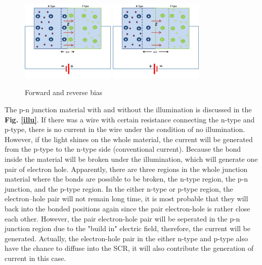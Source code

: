 \documentclass[a4paper, 12pt, titlepage,oneside,drop]{kthesis}
\begin{document}
\begin{figure}[H]
    \begin{center}
            \includegraphics[width=0.4\textwidth,clip]{forwardbias.jpg}
            \includegraphics[width=0.4\textwidth,clip]{reversebias.jpg}
     \end{center}
    \caption{Forward and reverse bias}      
    \label{frb}
\end{figure}


The p-n junction material with and without the illumination is discussed in the \textbf{Fig. \ref{illu}}. If there was a wire with certain resistance connecting the n-type and p-type, there is no current in the wire under the condition of no illumination. However, if the light shines on the whole material, the current will be generated from the 
p-type to the n-type side (conventional current). Because the bond inside the material will be broken under the illumination, which will generate one pair of electron hole. Apparently, there are three regions in the whole junction material where the bonds are possible to be broken, the n-type region, the p-n junction, and
the p-type region. In the either n-type or p-type region, the electron–hole pair will not remain long time,  it is most probable that they will back into the bonded positions again since the pair electron-hole is rather close each other. However, the pair
electron-hole pair will be seperated in the p-n junction region due to the "build in" electric field, therefore, the current will be generated. Actually, the electron-hole pair in the either n-type and p-type also have the chance to diffuse into 
the SCR, it will also contribute the generation of current in this case.
\end{document}

